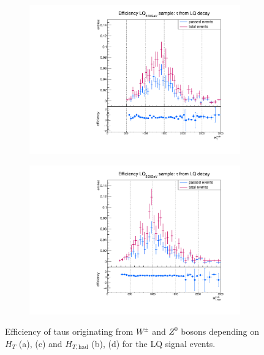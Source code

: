 \begin{figure}
\begin{subfigure}[t]{0.49\textwidth}
                \label{Dividedprompt:signal:HThadLQ75}
                \end{subfigure}
                \begin{subfigure}[t]{0.49\textwidth}
                \includegraphics[width=\textwidth]{figures/plots/LQ76/Divided_fromLQHT.pdf}
                \label{Dividedprompt:signal:HTLQ76}
                \end{subfigure}
                \begin{subfigure}[t]{0.49\textwidth}
                \includegraphics[width=\textwidth]{figures/plots/LQ76/Divided_fromLQHThad.pdf}
                \label{Divided:prompt:signal:HThadLQ76}
                \end{subfigure}
\caption[Efficiency of taus originating from $W^\pm$ and $Z^0$ bosons for the LQ signal events.]{Efficiency of taus originating from $W^\pm$ and $Z^0$ bosons depending on $H_{T}$ (a), (c) and $H_{T,\text{had}}$ (b), (d) for the LQ signal events.}
\label{Dividedprompt:signal:HTgedöns}
\end{figure}
